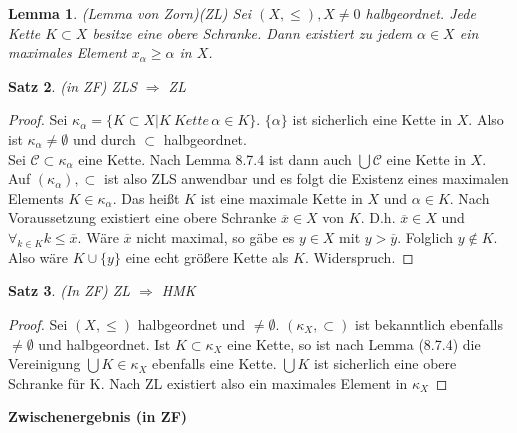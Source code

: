 \documentclass[12pt,a4paper]{article}
\newtheorem{theorem}{Satz}
\newtheorem{lemma}[theorem]{Lemma}
\theoremstyle{definition}
\theoremstyle{remark}
\renewcommand{\bar}[1]{\overline{#1}}
\begin{document}
		\begin{lemma}{(Lemma von Zorn)(ZL)}
			Sei $(X, \leq), X \neq 0$ halbgeordnet. Jede Kette $K \subset X$ besitze eine obere Schranke. Dann existiert zu jedem $\alpha \in X$ ein maximales Element $x_{\alpha} \geq \alpha$ in $X$.
		\end{lemma}
		\begin{theorem}{(in ZF)}
			ZLS $\Rightarrow$ ZL
		\end{theorem}
		\begin{proof}
			Sei $\kappa_{\alpha} = \{ K \subset X | K \ Kette \, \alpha \in K \}$. $\{ \alpha \}$ ist sicherlich eine Kette in $X$. Also ist $\kappa_{\alpha} \neq \emptyset$ und durch $\subset$ halbgeordnet. \\
			Sei $\mathcal{C} \subset \kappa_{\alpha}$ eine Kette. Nach Lemma 8.7.4 ist dann auch $\bigcup \mathcal{C}$ eine Kette in $X$. Auf $(\kappa_{\alpha}), \subset$ ist also ZLS anwendbar und es folgt die Existenz eines maximalen Elements $K \in \kappa_{\alpha}$. Das heißt $K$ ist eine maximale Kette in $X$ und $\alpha \in K$. Nach Voraussetzung existiert eine obere Schranke $\bar{x} \in X$ von $K$. D.h. $\bar{x} \in X$ und $\forall_{k \in K} k \leq \bar{x}$. Wäre $\bar{x}$ nicht maximal, so gäbe es $y \in X$ mit $y > \bar{y}$. Folglich $y \notin K$. Also wäre $K \cup \{ y \}$ eine echt größere Kette als $K$. Widerspruch.
		\end{proof}
		\begin{theorem}{(In ZF)}
			ZL $\Rightarrow$ HMK
		\end{theorem}
		\begin{proof}
			Sei $(X, \leq)$ halbgeordnet und $\neq \emptyset$. $(\kappa_X, \subset)$ ist bekanntlich ebenfalls $\neq \emptyset$ und halbgeordnet. Ist $K \subset \kappa_X$ eine Kette, so ist nach Lemma (8.7.4) die Vereinigung $\bigcup K \in \kappa_X$ ebenfalls eine Kette. $\bigcup K$ ist sicherlich eine obere Schranke für K. Nach ZL existiert also ein maximales Element in $\kappa_X$
		\end{proof}
		\textbf{Zwischenergebnis (in ZF)} \\
		\begin{center}
		\end{center}
\end{document}
